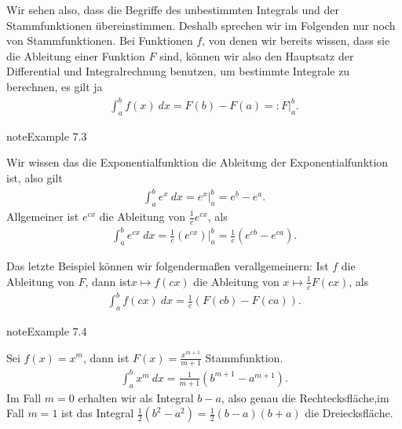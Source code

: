 \documentclass[letterpaper,10pt,english]{jupyterBook}
\begin{document}
Wir sehen also, dass die Begriffe des unbestimmten Integrals und der Stammfunktionen übereinstimmen. Deshalb sprechen wir im Folgenden nur noch von Stammfunktionen. Bei Funktionen \(f\), von denen wir bereits wissen, dass sie die Ableitung einer Funktion \(F\) sind, können wir also den Hauptsatz der Differential\sphinxhyphen{} und Integralrechnung benutzen, um bestimmte Integrale zu berechnen, es gilt ja
\begin{equation*}
\begin{split} \int_a^b f(x)~dx = F(b) - F(a) =: F\vert_a^b.\end{split}
\end{equation*}\label{integration/hdi:example-4}
\begin{sphinxadmonition}{note}{Example 7.3}



Wir wissen das die Exponentialfunktion die Ableitung der Exponentialfunktion ist, also gilt
\begin{equation*}
\begin{split} \int_a^b e^x ~dx = e^x\vert_a^b = e^b -e^a.\end{split}
\end{equation*}
Allgemeiner ist \(e^{cx}\) die Ableitung von \(\frac{1}c e^{cx}\), als
\begin{equation*}
\begin{split} \int_a^b e^{cx} ~dx =\frac{1}c (e^{cx})\vert_a^b = \frac{1}c (e^{cb} -e^{ca}).\end{split}
\end{equation*}\end{sphinxadmonition}

Das letzte Beispiel können wir folgendermaßen verallgemeinern: Ist \(f\) die Ableitung von \(F\), dann ist\(x \mapsto f(c x)\) die Ableitung von \(x\mapsto \frac{1}c F(cx)\), als
\begin{equation*}
\begin{split} \int_a^b f(cx)~dx = \frac{1}c (F(cb) - F(ca)).\end{split}
\end{equation*}\label{integration/hdi:example-5}
\begin{sphinxadmonition}{note}{Example 7.4}



Sei \(f(x) = x^m\), dann ist \(F(x) = \frac{x^{m+1}}{m+1}\) Stammfunktion.
\begin{equation*}
\begin{split} \int_a^b x^m ~dx =\frac{1}{m+1}  (b^{m+1} -a^{m+1}).\end{split}
\end{equation*}
Im Fall \(m=0\) erhalten wir als Integral \(b-a\), also genau die Rechtecksfläche,im Fall \(m=1\) ist das Integral \(\frac{1}2 (b^2-a^2) = \frac{1}2 (b-a)(b+a)\) die Dreiecksfläche.
\end{sphinxadmonition}
\end{document}

